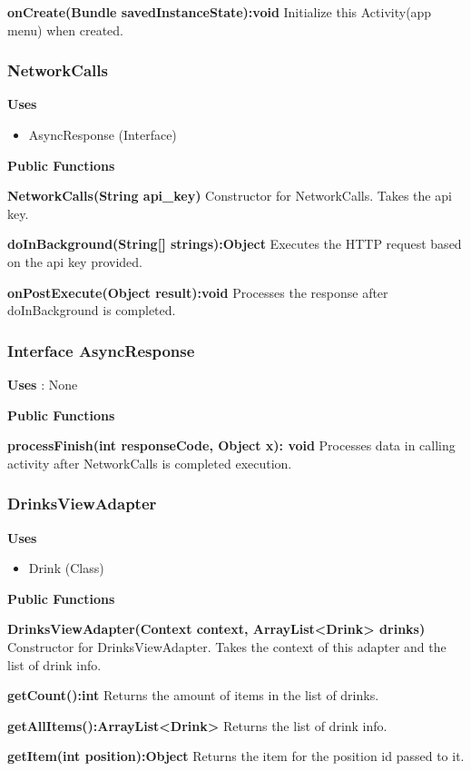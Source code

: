 \documentclass [10pt]{article}
\begin{document}
\textbf{onCreate(Bundle savedInstanceState):void}
Initialize this Activity(app menu) when created.

\subsubsection{NetworkCalls}
\textbf{Uses}
\begin{itemize}
	\item AsyncResponse (Interface)
\end{itemize}


\textbf{Public Functions}

\textbf{NetworkCalls(String api\_key)}
Constructor for NetworkCalls. Takes the api key.

\textbf{doInBackground(String[] strings):Object}
Executes the HTTP request based on the api key provided.

\textbf{onPostExecute(Object result):void}
Processes the response after doInBackground is completed.

\subsubsection{Interface AsyncResponse}
\textbf{Uses} : None

\textbf{Public Functions}

\textbf{processFinish(int responseCode, Object x): void}
Processes data in calling activity after NetworkCalls is completed execution.

\subsubsection{DrinksViewAdapter}

\textbf{Uses}
\begin{itemize}
	\item Drink (Class)
\end{itemize}

\textbf{Public Functions}

\textbf{DrinksViewAdapter(Context context, ArrayList<Drink> drinks)}
Constructor for DrinksViewAdapter. Takes the context of this adapter and the list of drink info.

\textbf{getCount():int}
Returns the amount of items in the list of drinks.

\textbf{getAllItems():ArrayList<Drink>}
Returns the list of drink info.

\textbf{getItem(int position):Object}
Returns the item for the position id passed to it.
\end{document}
